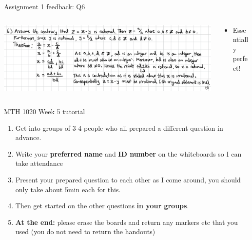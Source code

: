 \documentclass[aspectratio=169]{beamer}
\begin{document}
\begin{frame}{Assignment 1 feedback: Q6}
\begin{columns}
\begin{column}{0.7\textwidth}
    \begin{center}
  \includegraphics[width=\textwidth]{Q6}
     \end{center}
\end{column}
\begin{column}{0.3\textwidth}
  \begin{itemize}
    \item Essentially perfect!
  \end{itemize}
\end{column}
\end{columns}
\end{frame}

\begin{frame}{MTH 1020 Week 5 tutorial}
\begin{enumerate}
  \item Get into groups of 3-4 people who all prepared a different question in advance.
  \item Write your \textbf{preferred name} and \textbf{ID number} on the whiteboards so I can take attendance
  \item Present your prepared question to each other as I come around, you should only take about 5min each for this.
  \item Then get started on the other questions \textbf{in your groups}.
  \item \textbf{At the end:} please erase the boards and return any markers etc that you used (you do not need to return the handouts)
\end{enumerate}
\end{frame}
\end{document}
